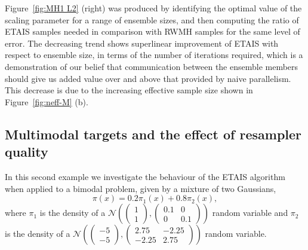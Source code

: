 \documentclass[final]{siamltex}
\begin{document}
Figure~\ref{fig:MH1 L2} (right) was produced by identifying the
optimal value of the scaling parameter for a range of ensemble sizes,
and then computing the ratio of ETAIS samples needed in comparison
with RWMH samples for the same level of error. The decreasing trend shows superlinear improvement of
ETAIS with respect to ensemble size, in terms of the number of
iterations required, which is a demonstration of our belief that
communication between the ensemble members should give us added value over and above that
provided by naive parallelism. This decrease is due to the increasing
effective sample size shown in Figure~\ref{fig:neff-M} (b).

\subsection{Multimodal targets and the effect of resampler quality}
\label{sec:bimodal}
{\red
In this second example we investigate the behaviour of the ETAIS
algorithm when applied to a bimodal problem, given by a mixture of two
Gaussians,
\[\pi(x) = 0.2\pi_1(x) + 0.8\pi_2(x),\]
where $\pi_1$ is the density of a $\mathcal{N}\left (\begin{pmatrix} 1
    \\ 1 \end{pmatrix}, \begin{pmatrix} 0.1 & 0 
    \\ 0 & 0.1 \end{pmatrix} \right )$ random variable and $\pi_2$ is the
  density of a $\mathcal{N}\left (\begin{pmatrix} -5
    \\ -5 \end{pmatrix}, \begin{pmatrix} 2.75 & -2.25 
    \\ -2.25 & 2.75 \end{pmatrix} \right )$ random variable.}
\end{document}
